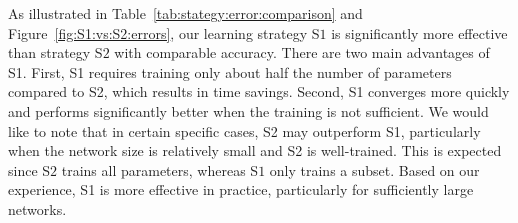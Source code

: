 \documentclass[review,hidelinks,onefignum,onetabnum]{siamart250211}
\begin{document}



As illustrated in Table~\ref{tab:stategy:error:comparison} and Figure~\ref{fig:S1:vs:S2:errors},  our learning strategy S\(1\) is significantly more effective than strategy S\(2\) with comparable accuracy. 
There are two main advantages of S1. First, S1 requires training only about half the number of parameters compared to S2, which results in time savings. Second, S1 converges more quickly and performs significantly better when the training is not sufficient. 
We would like to note that in certain specific cases, S2 may outperform S1, particularly when the network size is relatively small and S2 is well-trained. This is expected since S\(2\) trains all parameters, whereas S\(1\) only trains a subset.
Based on our experience, S1 is more effective in practice, particularly for sufficiently large networks.

\end{document}
